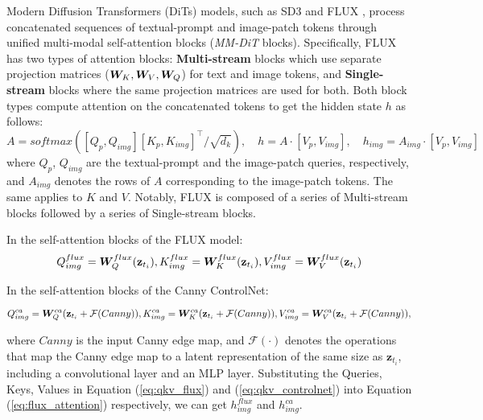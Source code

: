 \documentclass{article}
\newcommand{\mmdit}{\textit{MM-DiT}\xspace}
\begin{document}

Modern Diffusion Transformers (DiTs) models, such as SD3 \citep{esser2024scaling} and FLUX \citep{blackforest2024flux}, process concatenated sequences of textual-prompt and image-patch tokens through unified multi-modal self-attention blocks (\mmdit blocks). Specifically, FLUX has two types of attention blocks: \textbf{Multi-stream}  blocks which use separate projection matrices (${\bm{W}}_K, {\bm{W}}_V, {\bm{W}}_Q$) for text and image tokens, and \textbf{Single-stream} blocks where the same projection matrices are used for both. Both block types compute attention on the concatenated tokens to get the hidden state $h$ as follows:
\begin{equation}
    A = \textit{softmax}([Q_{p}, Q_{img}] [K_{p}, K_{img}]^\top / \sqrt{d_k}),\quad h = A \cdot [V_{p}, V_{img}],\quad h_{img} =  A_{img} \cdot [V_{p}, V_{img}] \label{eq:flux_attention}
\end{equation}
where $Q_{p}$, $Q_{img}$ are the textual-prompt and the image-patch queries, respectively, and $A_{img}$  denotes the rows of $A$ corresponding to the image-patch tokens. The same applies to $K$ and $V$.
Notably, FLUX is composed of a series of Multi-stream blocks followed by a series of Single-stream blocks. 

In the self-attention blocks of the FLUX model:
\begin{equation}
Q_{img}^{flux}={\bm{W}}_Q^{flux}(\mathbf{z}_{t_{i}}), K_{img}^{flux}={\bm{W}}_K^{flux}(\mathbf{z}_{t_{i}}), V_{img}^{flux}={\bm{W}}_V^{flux}(\mathbf{z}_{t_{i}})
\label{eq:qkv_flux}
\end{equation}

In the self-attention blocks of the Canny ControlNet:

\begin{equation}
Q_{img}^{ca}={\bm{W}}_Q^{ca}(\mathbf{z}_{t_{i}}+\mathcal{F}(Canny)), K_{img}^{ca}={\bm{W}}_K^{ca}(\mathbf{z}_{t_{i}}+\mathcal{F}(Canny)), V_{img}^{ca}={\bm{W}}_V^{ca}(\mathbf{z}_{t_{i}}+\mathcal{F}(Canny)),
\label{eq:qkv_controlnet}
\end{equation}

where $Canny$ is the input Canny edge map, and $\mathcal{F}(\cdot)$ denotes the operations that map the Canny edge map to a latent representation of the same size as $\mathbf{z}_{t_{i}}$, including a convolutional layer and an MLP layer. 
Substituting the Queries, Keys, Values in Equation (\ref{eq:qkv_flux}) and (\ref{eq:qkv_controlnet}) into Equation (\ref{eq:flux_attention}) respectively, we can get $h^{flux}_{img}$ and $h^{ca}_{img}$.
\end{document}
